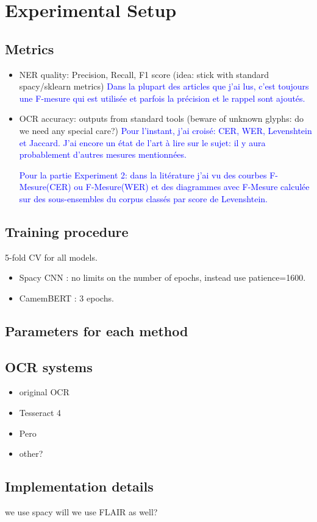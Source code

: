 \section{Experimental Setup}

\subsection{Metrics}
\begin{itemize}
    \item NER quality: Precision, Recall, F1 score (idea: stick with standard spacy/sklearn metrics) \textcolor{blue}{Dans la plupart des articles que j'ai lus, c'est toujours une F-mesure qui est utilisée et parfois la précision et le rappel sont ajoutés.}
    \item OCR accuracy: outputs from standard tools (beware of unknown glyphs: do we need any special care?) \textcolor{blue}{Pour l'instant, j'ai croisé: CER, WER, Levenshtein et Jaccard. J'ai encore un état de l'art à lire sur le sujet: il y aura probablement d'autres mesures mentionnées.}
    
    \textcolor{blue}{Pour la partie Experiment 2: dans la litérature j'ai vu des courbes F-Mesure(CER) ou F-Mesure(WER) et des diagrammes avec F-Mesure calculée sur des sous-ensembles du corpus classés par score de Levenshtein.}
\end{itemize}

\subsection{Training procedure}
5-fold CV for all models.
\begin{itemize}
\item Spacy CNN : no limits on the number of epochs, instead use patience=1600.
\item CamemBERT : 3 epochs.
\end{itemize}



\subsection{Parameters for each method}

\subsection{OCR systems}
\begin{itemize}
    \item original OCR
    \item Tesseract 4
    \item Pero
    \item other?
\end{itemize}

\subsection{Implementation details}
we use spacy 
will we use FLAIR as well?